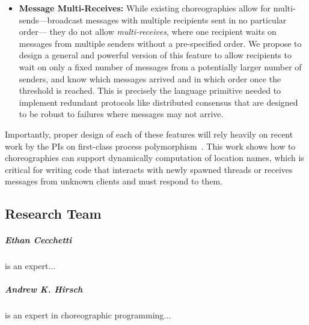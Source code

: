 \begin{itemize}[leftmargin=*]
  \item \textbf{Message Multi-Receives:}
    While existing choreographies allow for multi-sends---broadcast messages with multiple recipients sent in no particular order---%
    they do not allow \emph{multi-receives}, where one recipient waits on messages from multiple senders without a pre-specified order.
    We propose to design a general and powerful version of this feature
    to allow recipients to wait on only a fixed number of messages from a potentially larger number of senders,
    and know which messages arrived and in which order once the threshold is reached.
    This is precisely the language primitive needed to implement redundant protocols like distributed consensus
    that are designed to be robust to failures where messages may not arrive.
\end{itemize}

Importantly, proper design of each of these features will rely heavily
on recent work by the PIs on first-class process polymorphism~\citep{SamuelsonHC25}.
This work shows how to choreographies can support dynamically computation of location names,
which is critical for writing code that interacts with newly spawned threads
or receives messages from unknown clients and must respond to them.
\fi



\subsection{Research Team}


\subparagraph{Ethan Cecchetti} is an expert...

\subparagraph{Andrew K. Hirsch} is an expert in choreographic programming...

